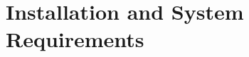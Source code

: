 \documentclass[11pt]{article}
\begin{document}






\newpage

\tableofcontents

\newpage

\section{Installation and System Requirements}
\end{document}
